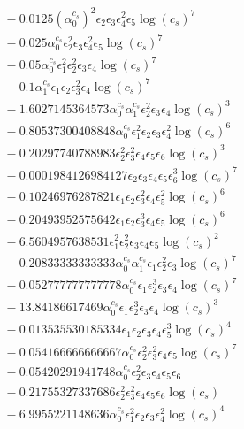 \documentclass[10pt]{article}
\begin{document}
\begin{align*}
&{}  - 0.0125 \left(\alpha_{0}^{c_s}\right)^{2} \epsilon_{2} \epsilon_{3} \epsilon_{4}^{2} \epsilon_{5} \log{\left(c_{s} \right)}^{7} \\
&{}  - 0.025 \alpha_{0}^{c_s} \epsilon_{2}^{2} \epsilon_{3} \epsilon_{4}^{2} \epsilon_{5} \log{\left(c_{s} \right)}^{7} \\
&{}  - 0.05 \alpha_{0}^{c_s} \epsilon_{1}^{2} \epsilon_{2}^{2} \epsilon_{3} \epsilon_{4} \log{\left(c_{s} \right)}^{7} \\
&{}  - 0.1 \alpha_{1}^{c_s} \epsilon_{1} \epsilon_{2} \epsilon_{3}^{2} \epsilon_{4} \log{\left(c_{s} \right)}^{7} \\
&{}  - 1.6027145364573 \alpha_{0}^{c_s} \alpha_{1}^{c_s} \epsilon_{2}^{2} \epsilon_{3} \epsilon_{4} \log{\left(c_{s} \right)}^{3} \\
&{}  - 0.80537300408848 \alpha_{0}^{c_s} \epsilon_{1}^{2} \epsilon_{2} \epsilon_{3} \epsilon_{4}^{2} \log{\left(c_{s} \right)}^{6} \\
&{}  - 0.20297740788983 \epsilon_{2}^{2} \epsilon_{3}^{2} \epsilon_{4} \epsilon_{5} \epsilon_{6} \log{\left(c_{s} \right)}^{3} \\
&{}  - 0.0001984126984127 \epsilon_{2} \epsilon_{3} \epsilon_{4} \epsilon_{5} \epsilon_{6}^{3} \log{\left(c_{s} \right)}^{7} \\
&{}  - 0.10246976287821 \epsilon_{1} \epsilon_{2} \epsilon_{3}^{2} \epsilon_{4} \epsilon_{5}^{2} \log{\left(c_{s} \right)}^{6} \\
&{}  - 0.20493952575642 \epsilon_{1} \epsilon_{2} \epsilon_{3}^{3} \epsilon_{4} \epsilon_{5} \log{\left(c_{s} \right)}^{6} \\
&{}  - 6.5604957638531 \epsilon_{1}^{2} \epsilon_{2}^{2} \epsilon_{3} \epsilon_{4} \epsilon_{5} \log{\left(c_{s} \right)}^{2} \\
&{}  - 0.20833333333333 \alpha_{0}^{c_s} \alpha_{1}^{c_s} \epsilon_{1} \epsilon_{2}^{2} \epsilon_{3} \log{\left(c_{s} \right)}^{7} \\
&{}  - 0.052777777777778 \alpha_{0}^{c_s} \epsilon_{1} \epsilon_{2}^{3} \epsilon_{3} \epsilon_{4} \log{\left(c_{s} \right)}^{7} \\
&{}  - 13.84186617469 \alpha_{0}^{c_s} \epsilon_{1} \epsilon_{2}^{3} \epsilon_{3} \epsilon_{4} \log{\left(c_{s} \right)}^{3} \\
&{}  - 0.013535530185334 \epsilon_{1} \epsilon_{2} \epsilon_{3} \epsilon_{4} \epsilon_{5}^{3} \log{\left(c_{s} \right)}^{4} \\
&{}  - 0.054166666666667 \alpha_{0}^{c_s} \epsilon_{2}^{2} \epsilon_{3}^{2} \epsilon_{4} \epsilon_{5} \log{\left(c_{s} \right)}^{7} \\
&{}  - 0.05420291941748 \alpha_{0}^{c_s} \epsilon_{2}^{2} \epsilon_{3} \epsilon_{4} \epsilon_{5} \epsilon_{6} \\
&{}  - 0.21755327337686 \epsilon_{2}^{2} \epsilon_{3}^{2} \epsilon_{4} \epsilon_{5} \epsilon_{6} \log{\left(c_{s} \right)} \\
&{}  - 6.9955221148636 \alpha_{0}^{c_s} \epsilon_{1}^{2} \epsilon_{2} \epsilon_{3} \epsilon_{4}^{2} \log{\left(c_{s} \right)}^{4}
\end{align*}
\end{document}
